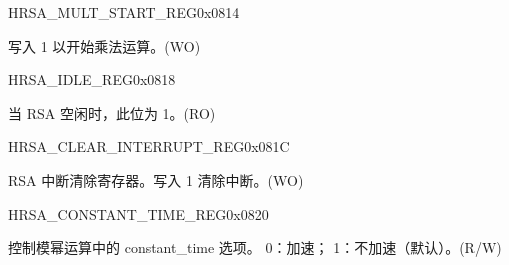 \begin{register}{H}{RSA\_MULT\_START\_REG}{0x{}0814}\label{regdesc:RSAMULTSTARTREG}
%
%
\regnewline%
\begin{regdesc}\begin{reglist}
\item [RSA\_MULT\_START] 写入 1 以开始乘法运算。(WO)
\end{reglist}\end{regdesc}
\end{register}



\begin{register}{H}{RSA\_IDLE\_REG}{0x{}0818}\label{regdesc:RSAIDLEREG}
%
%
\regnewline%
\begin{regdesc}\begin{reglist}
\item [RSA\_IDLE] 当 RSA 空闲时，此位为 1。(RO)
\end{reglist}\end{regdesc}
\end{register}


\begin{register}{H}{RSA\_CLEAR\_INTERRUPT\_REG}{0x{}081C}\label{regdesc:RSACLEARINTERRUPTREG}
%
%
\regnewline%
\begin{regdesc}\begin{reglist}
\item [RSA\_CLEAR\_INTERRUPT] RSA 中断清除寄存器。写入 1 清除中断。(WO)
\end{reglist}\end{regdesc}
\end{register}


\begin{register}{H}{RSA\_CONSTANT\_TIME\_REG}{0x{}0820}\label{regdesc:RSACONSTANTTIMEREG}
%
%
\regnewline%
\begin{regdesc}\begin{reglist}
\item [RSA\_CONSTANT\_TIME\_REG] 控制模幂运算中的 constant\_time 选项。
0：加速；
1：不加速（默认）。(R/W)
\end{reglist}\end{regdesc}
\end{register}


